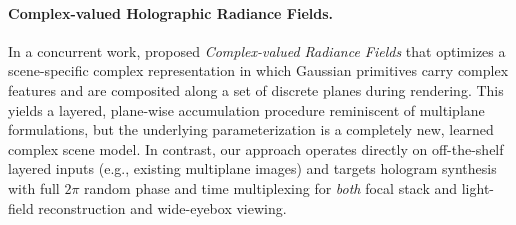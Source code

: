 \paragraph{\bf{Complex-valued Holographic Radiance Fields.}} In a concurrent work, \citet{zhan2025complexradiance} proposed \textit{Complex-valued Radiance Fields} that optimizes a scene-specific complex representation in which Gaussian primitives carry complex features and are composited along a set of discrete planes during rendering. This yields a layered, plane-wise accumulation procedure reminiscent of multiplane formulations, but the underlying parameterization is a completely new, learned complex scene model. In contrast, our approach operates directly on off-the-shelf layered inputs (e.g., existing multiplane images) and targets hologram synthesis with full $2\pi$ random phase and time multiplexing for \textit{both} focal stack and light-field reconstruction and wide-eyebox viewing.



